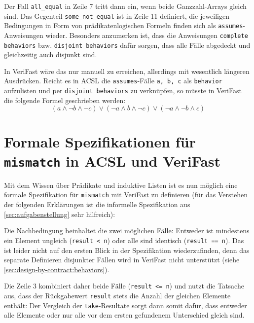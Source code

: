 

Der Fall \lstinline{all_equal} in Zeile 7 tritt dann ein, wenn beide Ganzzahl-Arrays gleich sind. Das 
Gegenteil \lstinline{some_not_equal} ist in Zeile 11 definiert, die jeweiligen Bedingungen in Form von
prädikatenlogischen Formeln finden sich als \lstinline{assumes}-Anweisungen wieder. Besonders anzumerken ist,
dass die Anweisungen \lstinline{complete behaviors} bzw. \lstinline{disjoint behaviors} dafür sorgen, dass
alle Fälle abgedeckt und gleichzeitig auch disjunkt sind.

In VeriFast wäre das nur manuell zu erreichen, allerdings mit wesentlich längeren Ausdrücken. Reicht 
es in ACSL die \lstinline{assumes}-Fälle \lstinline{a, b, c} als \lstinline{behavior} 
aufzulisten und per \lstinline{disjoint behaviors} zu verknüpfen, so müsste in VeriFast die folgende
Formel geschrieben werden:
\[(a \land \neg b \land \neg c) \lor (\neg a \land b \land \neg c) \lor (\neg a \land \neg b \land c)\]


\section{Formale Spezifikationen für \texttt{mismatch} in ACSL und VeriFast}

Mit dem Wissen über Prädikate und induktive Listen ist es nun möglich eine formale Spezifikation für \lstinline{mismatch} mit VeriFast
zu definieren (für das Verstehen der folgenden Erklärungen ist die informelle Spezifikation aus 
\ref{sec:aufgabenstellung} sehr hilfreich):



Die Nachbedingung beinhaltet die zwei möglichen Fälle: Entweder ist mindestens ein Element ungleich
(\lstinline{result < n}) oder alle sind identisch (\lstinline{result == n}). Das ist leider nicht auf den
ersten Blick in der Spezifikation wiederzufinden, denn das separate Definieren disjunkter Fällen wird in VeriFast 
nicht unterstützt (siehe \ref{sec:design-by-contract:behaviors}). 

Die Zeile 3 kombiniert daher beide Fälle (\lstinline{result <= n}) und nutzt die Tatsache aus, dass
der Rückgabewert \lstinline{result} stets die Anzahl der gleichen Elemente enthält: Der Vergleich der
\lstinline{take}-Resultate sorgt dann somit dafür, dass entweder alle Elemente oder nur
alle vor dem ersten gefundenem Unterschied gleich sind. 

